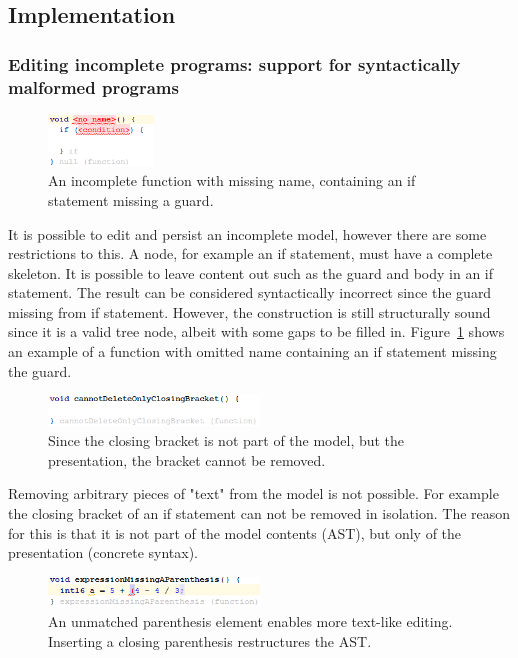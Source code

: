 \documentclass[preprint,numbers,10pt]{sigplanconf}
\begin{document}
\subsection{Implementation}

\subsubsection{Editing incomplete programs: support for syntactically malformed programs}
\begin{figure}[H]
	\centering
	\includegraphics[width=0.25\textwidth]{screens/IncompleteNode.png}
	\caption{An incomplete function with missing name, containing an if statement missing a guard.}
	\label{fig:IncompleteNode}
\end{figure}

It is possible to edit and persist an incomplete model, however there are some restrictions to this. A node, for example an if statement, must have a complete skeleton. It is possible to leave content out such as the guard and body in an if statement. The result can be considered syntactically incorrect since the guard missing from if statement. However, the construction is still structurally sound since it is a valid tree node, albeit with some gaps to be filled in. Figure~\ref{fig:IncompleteNode} shows an example of a function with omitted name containing an if statement missing the guard.

\begin{figure}[H]
	\centering
	\includegraphics[width=0.50\textwidth]{screens/CannotDeleteConcreteSyntaxElements.png}
	\caption{Since the closing bracket is not part of the model, but the presentation, the bracket cannot be removed.}
	\label{fig:CannotDeleteConcreteSyntaxElements}
\end{figure}
Removing arbitrary pieces of "text" from the model is not possible. For example the closing bracket of an if statement can not be removed in isolation. The reason for this is that it is not part of the model contents (AST), but only of the presentation (concrete syntax).

\begin{figure}[H]
	\centering
	\includegraphics[width=0.5\textwidth]{screens/UnmatchedParenthesis.png}
	\caption{An unmatched parenthesis element enables more text-like editing. Inserting a closing parenthesis restructures the AST.}
	\label{fig:UnmatchedParenthesis}
\end{figure}
\end{document}
